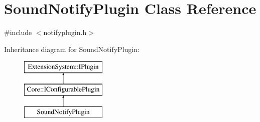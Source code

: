 \hypertarget{class_sound_notify_plugin}{\section{\-Sound\-Notify\-Plugin \-Class \-Reference}
\label{class_sound_notify_plugin}
}


{\ttfamily \#include $<$notifyplugin.\-h$>$}

\-Inheritance diagram for \-Sound\-Notify\-Plugin\-:\begin{figure}[H]
\begin{center}
\leavevmode
\includegraphics[height=3.000000cm]{class_sound_notify_plugin}
\end{center}
\end{figure}
